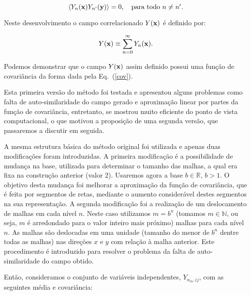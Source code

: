 \documentclass[12pt,a4paper,portuges]{article}
\newcommand{\Y}{{Y}}
\begin{document}
\[
	\left\langle {\Y}_{n}(\vetor{x}) {\Y}_{n^\prime}(\vetor{y}) \right\rangle = 0,\quad
\mbox{para todo $n \neq n^\prime$.}
\]

Neste desenvolvimento o campo correlacionado $\Y(\vetor{x})$ é definido por:

\begin{equation}
	\Y(\vetor{x}) \equiv \sum^\infty_{n=0} {\Y}_n(\vetor{x}).
\label{m1}
\end{equation}

Podemos demonstrar que o campo $\Y(\vetor{x})$ assim definido possui uma função de
covariância da forma dada pela Eq.~(\ref{cov}).

Esta primeira versão do método foi testada e apresentou alguns problemas como falta de
auto-similaridade do campo gerado e aproximação linear por partes da função de covariância,
entretanto, se mostrou muito eficiente do ponto de vista computacional, o que motivou a proposição
de uma segunda versão, que passaremos a discutir em seguida.

A mesma estrutura básica do método original foi utilizada e apenas duas modificações foram
introduzidas. A primeira modificação é a possibilidade de mudança na base, utilizada para
determinar
o tamanho das malhas, a qual era fixa na construção anterior (valor 2). Usaremos agora a base $b
\in
\mathbb{R}$, $b>1$. O objetivo desta mudança foi melhorar a aproximação da função de
covariância,
que é feita por segmentos de retas, mediante o aumento considerável destes segmentos na sua
representação. A segunda modificação foi a realização de um deslocamento de malhas em cada
nível
$n$. Neste caso utilizamos $m=b^{n}$ (tomamos $m \in \mathbb{N}$, ou seja, $m$ é arredondado para
o
valor inteiro mais próximo) malhas para cada nível $n$.
As malhas são deslocadas em uma unidade (tamanho do menor de $b^{n}$ dentre todas as malhas) nas
direções $x$ e $y$ com relação à malha anterior.
Este procedimento é introduzido para resolver o problema da falta de auto-similaridade do campo
obtido.

Então, consideramos o conjunto de variáveis independentes, ${\Y}_{n_m,ij}$, com as seguintes
média
e covariância:
\end{document}
